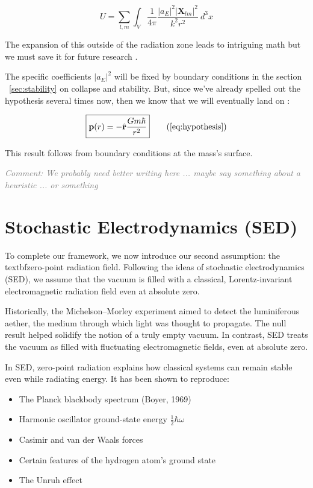 \documentclass {article}
\renewcommand\vec{\mathbf}
\let\OldHat\hat
\renewcommand{\hat}[1]{\OldHat{\mathbf{#1}}}
\newcommand{\comment}[1]{\textcolor{gray}{\small\textit{Comment: #1}}}
\begin{document}
\begin{equation}
U  =\sum_{l, m}   \int_V \frac 1 {4 \pi}  \frac {|a_E|^2 |\vec X_{lm} |^2}{k^2 r^2} ~ d^3x 
\label{eq:energy}
\end{equation}

The expansion of this outside of the radiation zone leads to intriguing math but we must save it for future research .

The specific coefficients \( |a_E|^2 \) will be fixed by boundary conditions in the section ~\ref{sec:stability} on collapse and stability. But, since we've already spelled out the hypothesis several times now, then we know that we will eventually land on
:

\begin{equation}
\boxed{
	\vec{p}(r) = -\hat{r} \frac{G m \hbar}{r^2}
}
\tag{\ref{eq:hypothesis}}
\end{equation}

This result follows from boundary conditions at the mass’s surface.

\comment{We probably need better writing here ... maybe say something about a heuristic ... or something}

\section{Stochastic Electrodynamics (SED)}

To complete our framework, we now introduce our second assumption:  the textbf{zero-point radiation field}. Following the ideas of stochastic electrodynamics (SED), we assume that the vacuum is filled with a classical, Lorentz-invariant electromagnetic radiation field even at absolute zero. 

Historically, the Michelson–Morley experiment aimed to detect the luminiferous aether, the medium through which light was thought to propagate. The null result helped solidify the notion of a truly empty vacuum. In contrast, SED treats the vacuum as filled with fluctuating electromagnetic fields, even at absolute zero.

In SED, zero-point radiation explains how classical systems can remain stable even while radiating energy. It has been shown to reproduce:
\begin{itemize}
	\item The Planck blackbody spectrum (Boyer, 1969) \cite{boyer1969}
	\item Harmonic oscillator ground-state energy \( \tfrac{1}{2} \hbar \omega \) \cite{cole2003}
	\item Casimir and van der Waals forces \cite{boyer1975}
	\item Certain features of the hydrogen atom’s ground state \cite{puthoff1987}
	\item The Unruh effect \cite{boyer1980}
\end{itemize}
\end{document}
